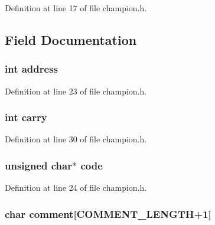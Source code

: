 Definition at line 17 of file champion.\-h.



\subsection{Field Documentation}
\hypertarget{structs__champion_a45c6bc6d1135dc398bf8deae861a2ebc}{
\subsubsection[{address}]{\setlength{\rightskip}{0pt plus 5cm}int address}}\label{structs__champion_a45c6bc6d1135dc398bf8deae861a2ebc}


Definition at line 23 of file champion.\-h.

\hypertarget{structs__champion_ac33dd0ad72380ad7b52434992811c5a7}{
\subsubsection[{carry}]{\setlength{\rightskip}{0pt plus 5cm}int carry}}\label{structs__champion_ac33dd0ad72380ad7b52434992811c5a7}


Definition at line 30 of file champion.\-h.

\hypertarget{structs__champion_a10a8d8076a169aad66a5134a4b372c91}{
\subsubsection[{code}]{\setlength{\rightskip}{0pt plus 5cm}unsigned char$\ast$ code}}\label{structs__champion_a10a8d8076a169aad66a5134a4b372c91}


Definition at line 24 of file champion.\-h.

\hypertarget{structs__champion_ae6da1ff2fd8abd8f79b0a42acf5b98b9}{
\subsubsection[{comment}]{\setlength{\rightskip}{0pt plus 5cm}char comment\mbox{[}{\bf C\-O\-M\-M\-E\-N\-T\-\_\-\-L\-E\-N\-G\-T\-H}+1\mbox{]}}}\label{structs__champion_ae6da1ff2fd8abd8f79b0a42acf5b98b9}


